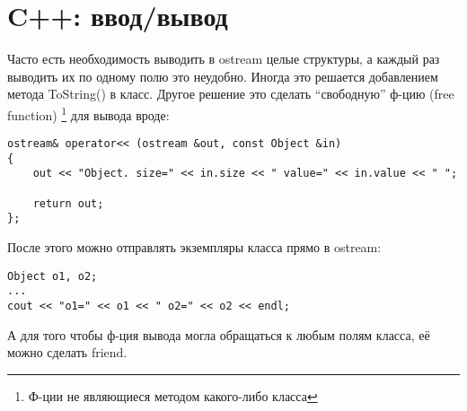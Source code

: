 \section{C++: ввод/вывод}

Часто есть необходимость выводить в ostream целые структуры, а каждый раз выводить их по одному полю это
неудобно. Иногда это решается добавлением метода ToString() в класс. 
Другое решение это сделать ``свободную'' ф-цию (free function)
\footnote{Ф-ции не являющиеся методом какого-либо класса} для вывода вроде:

\begin{lstlisting}
ostream& operator<< (ostream &out, const Object &in)
{
    out << "Object. size=" << in.size << " value=" << in.value << " ";

    return out;
};
\end{lstlisting}

После этого можно отправлять экземпляры класса прямо в ostream:

\begin{lstlisting}
Object o1, o2;
...
cout << "o1=" << o1 << " o2=" << o2 << endl;
\end{lstlisting}

А для того чтобы ф-ция вывода могла обращаться к любым полям класса, её можно сделать friend.

